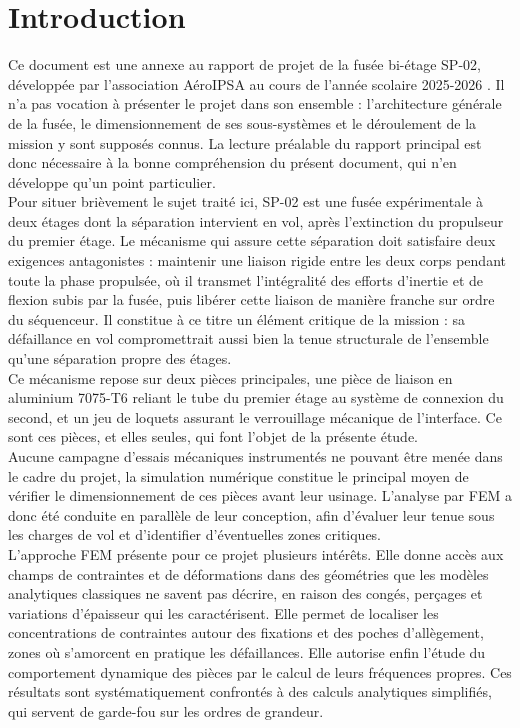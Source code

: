 \section*{Introduction}

Ce document est une annexe au rapport de projet de la fusée bi-étage SP-02, développée par
l'association AéroIPSA au cours de l'année scolaire 2025-2026 \cite{rapportSP02}. Il n'a pas
vocation à présenter le projet dans son ensemble : l'architecture générale de la fusée, le
dimensionnement de ses sous-systèmes et le déroulement de la mission y sont supposés connus.
La lecture préalable du rapport principal est donc nécessaire à la bonne compréhension du
présent document, qui n'en développe qu'un point particulier.\\

Pour situer brièvement le sujet traité ici, SP-02 est une fusée expérimentale à deux étages
dont la séparation intervient en vol, après l'extinction du propulseur du premier étage. Le
mécanisme qui assure cette séparation doit satisfaire deux exigences antagonistes : maintenir
une liaison rigide entre les deux corps pendant toute la phase propulsée, où il transmet
l'intégralité des efforts d'inertie et de flexion subis par la fusée, puis libérer cette
liaison de manière franche sur ordre du séquenceur. Il constitue à ce titre un élément
critique de la mission : sa défaillance en vol compromettrait aussi bien la tenue structurale
de l'ensemble qu'une séparation propre des étages.\\

Ce mécanisme repose sur deux pièces principales, une pièce de liaison en aluminium 7075-T6
reliant le tube du premier étage au système de connexion du second, et un jeu de loquets
assurant le verrouillage mécanique de l'interface. Ce sont ces pièces, et elles seules, qui
font l'objet de la présente étude.\\

Aucune campagne d'essais mécaniques instrumentés ne pouvant être menée dans le cadre du
projet, la simulation numérique constitue le principal moyen de vérifier le dimensionnement
de ces pièces avant leur usinage. L'analyse par \acrfull{FEM} a donc été conduite en parallèle
de leur conception, afin d'évaluer leur tenue sous les charges de vol et d'identifier
d'éventuelles zones critiques.\\

L'approche \acrshort{FEM} présente pour ce projet plusieurs intérêts. Elle donne accès aux
champs de contraintes et de déformations dans des géométries que les modèles analytiques
classiques ne savent pas décrire, en raison des congés, perçages et variations d'épaisseur
qui les caractérisent. Elle permet de localiser les concentrations de contraintes autour des
fixations et des poches d'allègement, zones où s'amorcent en pratique les défaillances. Elle
autorise enfin l'étude du comportement dynamique des pièces par le calcul de leurs fréquences
propres. Ces résultats sont systématiquement confrontés à des calculs analytiques simplifiés,
qui servent de garde-fou sur les ordres de grandeur.\\

